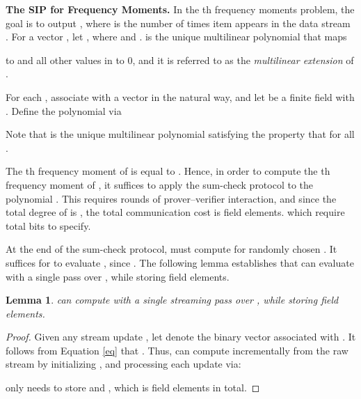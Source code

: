 \documentclass[11pt, letterpaper]{article}
\newtheorem{lemma}[theorem]{Lemma}
\begin{document}
\medskip \noindent \textbf{The SIP for Frequency Moments.}
In the th frequency moments problem, the goal is to output , where 
is the number of times item  appears in the data stream . 
For a vector , let 
, where  and .  is the unique multilinear polynomial that maps 

to  and all other values in  to 0, and it is referred to
as the \emph{multilinear extension} of . 

For each , associate  with a vector  in the natural way, and
let  be a finite field with .
Define the polynomial  via

Note that  is the unique multilinear polynomial satisfying the property that  for all
.

The th frequency moment of  is equal to .
Hence, in order to compute the th frequency moment of , 
it suffices to apply the sum-check protocol to the polynomial . 
This requires  rounds of prover--verifier interaction, and since the total degree of  is , 
the total communication cost is  field elements.
which require  total bits to specify. 

At the end of the sum-check protocol,  must compute  for randomly chosen . It suffices for  to evaluate , since . The following lemma establishes
that  can evaluate  with a single pass over , while storing  field elements.

\begin{lemma}
 can compute  with a single streaming pass over , while storing  field elements.
\end{lemma}
\begin{proof}
Given any stream update , let  denote the binary vector associated with . 
It follows from Equation \eqref{eq} that .
Thus,  can compute  incrementally from the raw stream by initializing , and processing each update  via:

 only needs to store  and , which is  field elements in total.
\end{proof}

\nocite{aw, prakash, ccs,allspice, bestorder}
\end{document}

